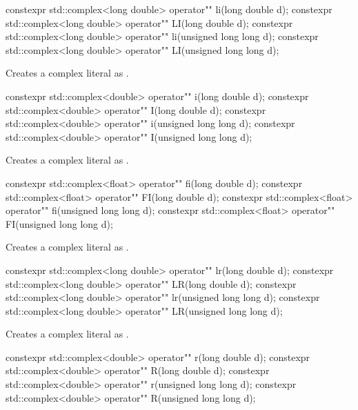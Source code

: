 \documentclass[ebook,11pt,article]{memoir}
\begin{document}
\begin{itemdecl}
constexpr std::complex<long double> operator"" li(long double d);
constexpr std::complex<long double> operator"" LI(long double d);
constexpr std::complex<long double> operator"" li(unsigned long long d);
constexpr std::complex<long double> operator"" LI(unsigned long long d);
\end{itemdecl}

\begin{itemdescr}
\pnum
\effects
Creates a complex literal as .
\end{itemdescr}

\begin{itemdecl}
constexpr std::complex<double> operator"" i(long double d);
constexpr std::complex<double> operator"" I(long double d);
constexpr std::complex<double> operator"" i(unsigned long long d);
constexpr std::complex<double> operator"" I(unsigned long long d);
\end{itemdecl}

\begin{itemdescr}
\pnum
\effects
Creates a complex literal as .
\end{itemdescr}

\begin{itemdecl}
constexpr std::complex<float> operator"" fi(long double d);
constexpr std::complex<float> operator"" FI(long double d);
constexpr std::complex<float> operator"" fi(unsigned long long d);
constexpr std::complex<float> operator"" FI(unsigned long long d);
\end{itemdecl}

\begin{itemdescr}
\pnum
\effects
Creates a complex literal as .
\end{itemdescr}

\begin{itemdecl}
constexpr std::complex<long double> operator"" lr(long double d);
constexpr std::complex<long double> operator"" LR(long double d);
constexpr std::complex<long double> operator"" lr(unsigned long long d);
constexpr std::complex<long double> operator"" LR(unsigned long long d);
\end{itemdecl}

\begin{itemdescr}
\pnum
\effects
Creates a complex literal as .
\end{itemdescr}
\begin{itemdecl}
constexpr std::complex<double> operator"" r(long double d);
constexpr std::complex<double> operator"" R(long double d);
constexpr std::complex<double> operator"" r(unsigned long long d);
constexpr std::complex<double> operator"" R(unsigned long long d);
\end{itemdecl}
\end{document}
